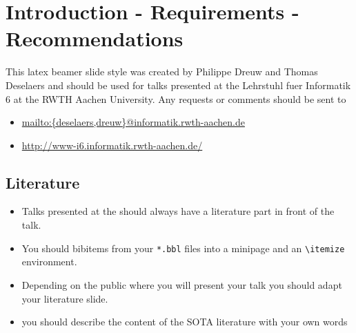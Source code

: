 \documentclass[11pt,a4paper,landscape]{article}
\begin{document}
\TitlePage

\dosecttoc
\ToC


\NewPage\section{Introduction - Requirements - Recommendations} 
\secttoc
\vfill
This latex beamer slide style was created by Philippe Dreuw and Thomas
Deselaers and should be used for talks presented at the Lehrstuhl fuer
Informatik 6 at the RWTH Aachen University.
\vfill
Any requests or comments should be sent to
\begin{itemize}
\item \url{mailto:{deselaers,dreuw}@informatik.rwth-aachen.de}
\item \url{http://www-i6.informatik.rwth-aachen.de/}
\end{itemize}
\vfill


\NewPage\subsection{Literature} 
\begin{itemize}
\item Talks presented at the
  \href{http://www-i6.rwth-aachen.de/}{\isechsicon}
  should always have a literature part in front of the talk. 
\item You should  bibitems from your \texttt{*.bbl} files
  into a minipage and an \texttt{\textbackslash itemize} environment.
\item Depending on the public where you will present your talk you should adapt
  your literature slide.
\item you should describe the content of the SOTA literature with your
  own words
\end{itemize}
\end{document}
